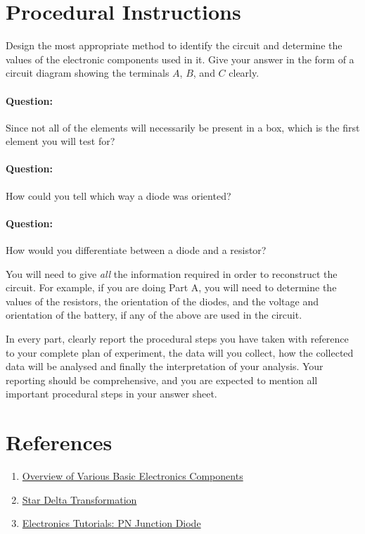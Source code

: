 \section*{Procedural Instructions}

Design the most appropriate method to identify the circuit and determine the values of the electronic components used  in it. Give your answer in the form of a circuit diagram showing the terminals $A$, $B$, and $C$ clearly. 

\begin{question}
\paragraph{Question:} Since not all of the elements will necessarily be present in a box, which is the first element you will test for?~\\

\paragraph{Question:} How could you tell which way a diode was oriented? ~\\

\paragraph{Question:} How would you differentiate between a diode and a resistor?
\end{question}


You will need to give \textit{all} the information required in order to reconstruct the circuit. For example, if you are doing Part A, you will need to determine the values of the resistors, the orientation of the diodes, and the voltage and orientation of the battery, if any of the above are used in the circuit.

In every part, clearly report the procedural steps you have taken with reference to your complete plan of experiment, the data will you collect, how the collected data will be analysed and finally the interpretation of your analysis. Your reporting should be comprehensive, and you are expected to mention all important procedural steps in your answer sheet.



\section*{References}

\begin{enumerate}

\item \href{https://www.elprocus.com/major-electronic-components/}{Overview of Various Basic Electronics Components}

\item \href{https://www.electronics-tutorials.ws/dccircuits/dcp_10.html}{Star Delta Transformation}

\item \href{https://www.electronics-tutorials.ws/diode/diode_3.html}{Electronics Tutorials: PN Junction Diode}

\end{enumerate}


\newpage